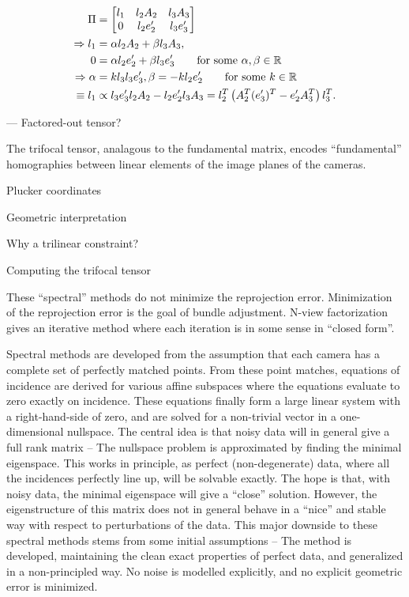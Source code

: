 \documentclass{article}
\begin{document}
\begin{align*}
    \Pi &= \begin{bmatrix} l_1 & l_2 A_2 & l_3 A_3 \\ 0 & l_2 e_2^\prime & l_3 e_3^\prime \end{bmatrix} \\
    \Rightarrow l_1 &= \alpha l_2 A_2 + \beta l_3 A_3, \\
                  0 &= \alpha l_2 e^\prime_2 + \beta l_3 e^\prime_3 \text{\quad\quad for some $\alpha,\beta \in \mathbb{R}$}\\
    \Rightarrow \alpha &= kl_3 l_3 e^\prime_3, \beta = -k l_2 e^\prime_2 \text{\quad\quad for some $k \in \mathbb{R}$} \\
    \equiv l_1 &\propto l_3 e^\prime_3 l_2 A_2 - l_2 e^\prime_2 l_3 A_3 = l_2^T\left(A_2^T (e_3^\prime)^T - e_2^\prime A_3^T\right)l_3^T.
\end{align*}

--- Factored-out tensor?

The trifocal tensor, analagous to the fundamental matrix, encodes ``fundamental'' homographies between linear elements
of the image planes of the cameras.


Plucker coordinates

Geometric interpretation

Why a trilinear constraint?

Computing the trifocal tensor


These ``spectral'' methods do not minimize the reprojection error. Minimization of the reprojection error
is the goal of bundle adjustment. N-view factorization gives an iterative method where each iteration is
in some sense in ``closed form''.


Spectral methods are developed from the assumption that each camera has a complete set of perfectly matched points.
From these point matches, equations of incidence are derived for various affine subspaces where the equations evaluate to zero
exactly on incidence. These  equations finally form a large linear system with a right-hand-side of zero,
and are solved for a non-trivial vector in a one-dimensional nullspace. The central idea is that noisy data will in general
give a full rank matrix -- The nullspace problem is approximated by finding the minimal eigenspace. This works in principle,
as perfect (non-degenerate) data, where all the incidences perfectly line up, will be solvable exactly.
The hope is that, with noisy data, the minimal eigenspace will give a ``close'' solution.
However, the eigenstructure of this matrix does not in general behave in a ``nice'' and stable way with respect to perturbations of the data.
This major downside to these spectral methods stems from some initial assumptions -- The method is developed, maintaining the clean exact
properties of perfect data, and generalized in a non-principled way. No noise is modelled explicitly, and no explicit geometric error is minimized.
\end{document}
